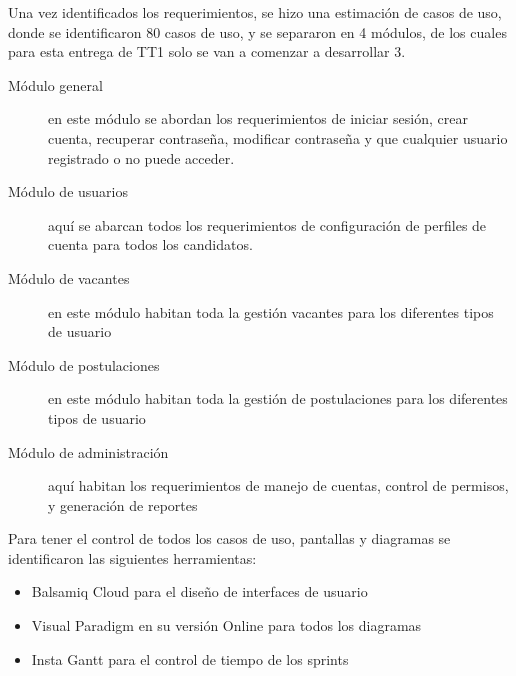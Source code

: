     Una vez identificados los requerimientos, se hizo una estimación de casos de uso, donde se identificaron 80 casos de uso, y se separaron en 4 módulos, de los cuales para esta entrega de TT1 solo se van a comenzar a desarrollar 3.
    \begin{description}
        \item[Módulo general] en este módulo se abordan los requerimientos de iniciar sesión, crear cuenta, recuperar contraseña, modificar contraseña y que cualquier usuario registrado o no puede acceder.
        \item[Módulo de usuarios] aquí se abarcan todos los requerimientos de configuración de perfiles de cuenta para todos los candidatos.
        \item[Módulo de vacantes] en este módulo habitan toda la gestión vacantes para los diferentes tipos de usuario
        \item[Módulo de postulaciones]  en este módulo habitan toda la gestión de postulaciones para los diferentes tipos de usuario

        \item[Módulo de administración] aquí habitan los requerimientos de manejo de cuentas, control de permisos, y generación de reportes
\end{description} 


Para tener el control de todos los casos de uso, pantallas y diagramas se identificaron las siguientes herramientas:
\begin{itemize} 
    \item Balsamiq Cloud para el diseño de interfaces de usuario 
    \item Visual Paradigm en su versión Online para todos los diagramas
    \item Insta Gantt para el control de tiempo de los sprints
\end{itemize} 
